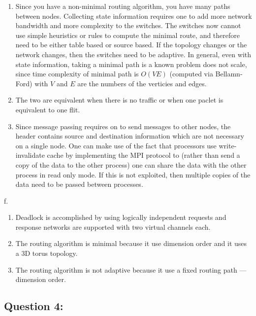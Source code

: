 \begin{enumerate}
\def\labelenumi{\alph{enumi}.}
\setcounter{enumi}{2}
\item
  Since you have a non-minimal routing algorithm, you have many paths
  between nodes. Collecting state information requires one to add more
  network bandwidth and more complexity to the switches. The switches
  now cannot use simple heuristics or rules to compute the minimal
  route, and therefore need to be either table based or source based. If
  the topology changes or the network changes, then the switches need to
  be adaptive. In general, even with state information, taking a minimal
  path is a known problem does not scale, since time complexity of
  minimal path is $O(VE)$ (computed via Bellamn-Ford) with $V$ and $E$
  are the numbers of the verticies and edges.
\item
  The two are equivalent when there is no traffic or when one paclet is
  equivalent to one flit.
\item
  Since message passing requires on to send messages to other nodes, the
  header contains source and destination information which are not
  necessary on a single node. One can make use of the fact that
  processors use write-invalidate cache by implementing the MPI protocol
  to (rather than send a copy of the data to the other process) one can
  share the data with the other process in read only mode. If this is
  not exploited, then multiple copies of the data need to be passed
  between processes.
\end{enumerate}

f.

\begin{enumerate}
\def\labelenumi{\arabic{enumi}.}
\item
  Deadlock is accomplished by using logically independent requests and
  response networks are supported with two virtual channels each.
\item
  The routing algorithm is minimal because it use dimension order and it
  uses a 3D torus topology.
\item
  The routing algorithm is not adaptive because it use a fixed routing
  path --- dimension order.
\end{enumerate}

\subsection{Question 4:}\label{question-4}

